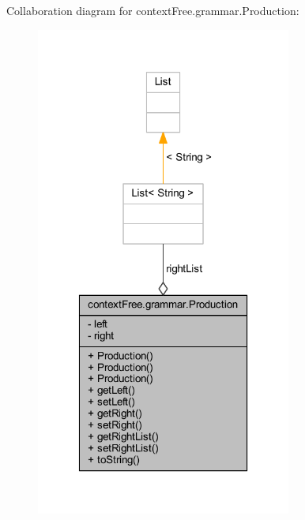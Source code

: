 Collaboration diagram for context\-Free.\-grammar.\-Production\-:
\nopagebreak
\begin{figure}[H]
\begin{center}
\leavevmode
\includegraphics[width=238pt]{classcontext_free_1_1grammar_1_1_production__coll__graph}
\end{center}
\end{figure}
